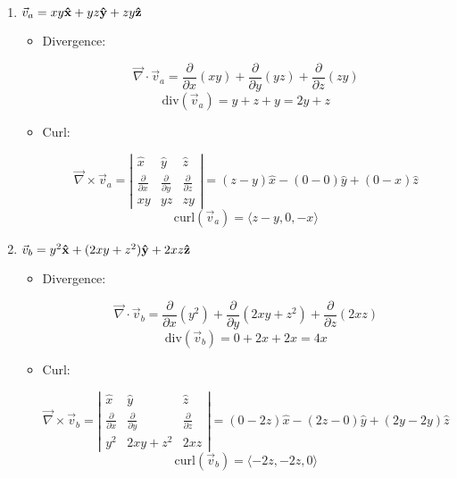 \begin{enumerate}
\begin{enumerate}
      \item $\vec{v}_a=xy\bold{\hat{x}}+yz\bold{\hat{y}}+zy\bold{\hat{z}}$

        \begin{itemize}

          \item Divergence:

            $$\vec{\nabla}\cdot \vec{v}_a=\frac{\partial}{\partial x}(xy)+\frac{\partial}{\partial y}(yz)+\frac{\partial}{\partial z}(zy)$$
            $$\text{div}(\vec{v}_a)=y+z+y=2y+z$$

          \item Curl:

            $$\vec{\nabla}\times\vec{v}_a=\left|\begin{matrix} \hat{x} & \hat{y} & \hat{z}\\ \frac{\partial}{\partial x} & \frac{\partial}{\partial y} & \frac{\partial}{\partial z} \\ xy & yz & zy \end{matrix}\right|=(z-y)\hat{x}-(0-0)\hat{y}+(0-x)\hat{z}$$
            $$\text{curl}(\vec{v}_a)=\langle z-y, 0, -x\rangle$$

        \end{itemize}

      \item $\vec{v}_b=y^2\bold{\hat{x}}+(2xy+z^2)\bold{\hat{y}}+2xz\bold{\hat{z}}$

        \begin{itemize}

          \item Divergence:

            $$\vec{\nabla}\cdot\vec{v}_b=\frac{\partial}{\partial x}(y^2)+\frac{\partial}{\partial y}(2xy+z^2)+\frac{\partial}{\partial z}(2xz)$$
            $$\text{div}(\vec{v}_b)=0+2x+2x=4x$$

          \item Curl:

            $$\vec{\nabla}\times\vec{v}_b=\left|\begin{matrix} \hat{x} & \hat{y} & \hat{z}\\ \frac{\partial}{\partial x} & \frac{\partial}{\partial y} & \frac{\partial}{\partial z} \\ y^2 & 2xy+z^2 & 2xz \end{matrix}\right|=(0-2z)\hat{x}-(2z-0)\hat{y}+(2y-2y)\hat{z}$$
            $$\text{curl}(\vec{v}_b)=\langle -2z, -2z, 0\rangle$$

        \end{itemize}


\end{enumerate}
\end{enumerate}

